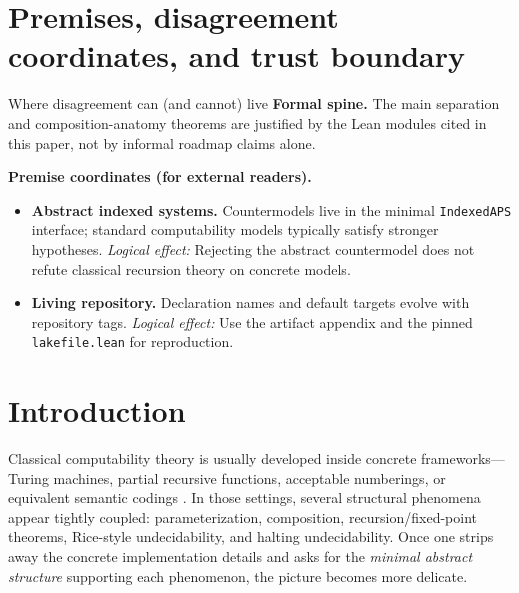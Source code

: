 \documentclass[11pt]{article}
\begin{document}


\section{Premises, disagreement coordinates, and trust boundary}\label{sec:premises-aps-composition}
\begin{keybox}{Where disagreement can (and cannot) live}
\textbf{Formal spine.}
The main separation and composition-anatomy theorems are justified by the Lean modules cited in this paper, not by informal roadmap claims alone.

\medskip
\textbf{Premise coordinates (for external readers).}
{\raggedright
\begin{itemize}[leftmargin=2em]
\item \textbf{Abstract indexed systems.} Countermodels live in the minimal \texttt{IndexedAPS} interface; standard computability models typically satisfy stronger hypotheses.
  \emph{Logical effect:} Rejecting the abstract countermodel does not refute classical recursion theory on concrete models.
\item \textbf{Living repository.} Declaration names and default targets evolve with repository tags.
  \emph{Logical effect:} Use the artifact appendix and the pinned \texttt{lakefile.lean} for reproduction.
\end{itemize}
\par}
\end{keybox}

\tableofcontents

\section{Introduction}\label{sec:introduction}

Classical computability theory is usually developed inside concrete frameworks---Turing machines, partial recursive functions, acceptable numberings, or equivalent semantic codings \cite{Kleene1938,Rice1953,Rogers1958,Rogers1987,Odifreddi1989}.  In those settings, several structural phenomena appear tightly coupled: parameterization, composition, recursion/fixed-point theorems, Rice-style undecidability, and halting undecidability.  Once one strips away the concrete implementation details and asks for the \emph{minimal abstract structure} supporting each phenomenon, the picture becomes more delicate.
\end{document}
